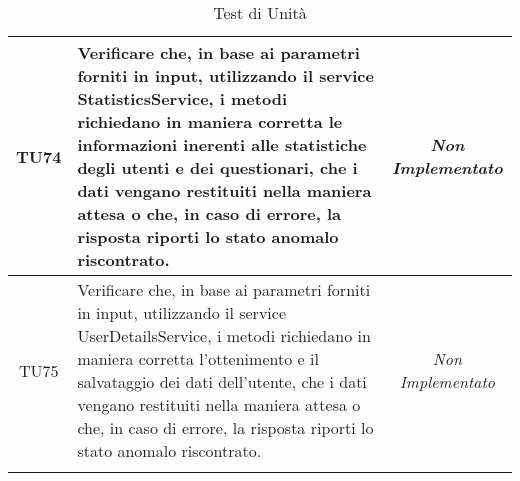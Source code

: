 \begin{longtable}{|c|>{}m{10cm}|c|}
\hypertarget{TU74}{TU74} & Verificare che, in base ai parametri forniti in input, utilizzando il service StatisticsService, i metodi richiedano in maniera corretta le informazioni inerenti alle statistiche degli utenti e dei questionari, che i dati vengano restituiti nella maniera attesa o che, in caso di errore, la risposta riporti lo stato anomalo riscontrato. & \textit{Non Implementato}\\ \hline
\hypertarget{TU75}{TU75} & Verificare che, in base ai parametri forniti in input, utilizzando il service UserDetailsService, i metodi richiedano in maniera corretta l'ottenimento  e il salvataggio dei dati dell'utente, che i dati vengano restituiti nella maniera attesa o che, in caso di errore, la risposta riporti lo stato
anomalo riscontrato. & \textit{Non Implementato}\\ \hline
\caption[Test di Unità]{Test di Unità}
\label{tabella:test3}
\end{longtable}
\clearpage
